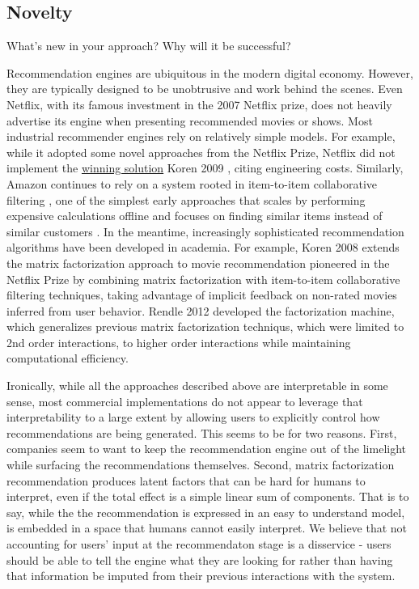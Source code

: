 \subsection{Novelty}
What's new in your approach? Why will it be successful?

Recommendation engines are ubiquitous in the modern digital economy. However, they are typically designed to be unobtrusive and work behind the scenes. Even Netflix, with its famous investment in the 2007 Netflix prize, does not heavily advertise its engine when presenting recommended movies or shows. Most industrial recommender engines rely on relatively simple models. For example, while it adopted some novel approaches from the Netflix Prize, Netflix did not implement the \href{https://www.wired.com/2012/04/netflix-prize-costs/}{winning solution} Koren 2009 \cite{koren2009bellkor}, citing engineering costs. Similarly, Amazon continues to rely on a system rooted in item-to-item collaborative filtering \cite{smith2017two}, one of the simplest early approaches that scales by performing expensive calculations offline and focuses on finding similar items instead of similar customers \cite{linden2003amazon}. In the meantime, increasingly sophisticated recommendation algorithms have been developed in academia. For example, Koren 2008 \cite{koren2008factorization} extends the matrix factorization approach to movie recommendation pioneered \cite{funk2006netflix} in the Netflix Prize by combining matrix factorization with item-to-item collaborative filtering techniques, taking advantage of implicit feedback on non-rated movies inferred from user behavior. Rendle 2012 \cite{rendle2012factorization} developed the factorization machine, which generalizes previous matrix factorization techniqus, which were limited to 2nd order interactions, to higher order interactions while maintaining computational efficiency.

Ironically, while all the approaches described above are interpretable in some sense, most commercial implementations do not appear to leverage that interpretability to a large extent by allowing users to explicitly control how recommendations are being generated. This seems to be for two reasons. First, companies seem to want to keep the recommendation engine out of the limelight while surfacing the recommendations themselves. Second, matrix factorization recommendation produces latent factors that can be hard for humans to interpret, even if the total effect is a simple linear sum of components. That is to say, while the the recommendation is expressed in an easy to understand model, is embedded in a space that humans cannot easily interpret. We believe that not accounting for users' input at the recommendaton stage is a disservice - users should be able to tell the engine what they are looking for rather than having that information be imputed from their previous interactions with the system. 

